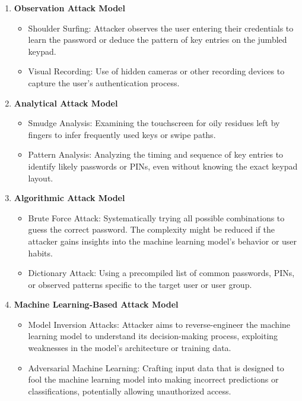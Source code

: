 \documentclass{article}
\begin{document}
\begin{enumerate}[label=\arabic*.]
    \item \textbf{Observation Attack Model}
    \begin{itemize}
        \item Shoulder Surfing: Attacker observes the user entering their credentials to learn the password or deduce the pattern of key entries on the jumbled keypad.
        \item Visual Recording: Use of hidden cameras or other recording devices to capture the user's authentication process.
    \end{itemize}
    
    \item \textbf{Analytical Attack Model}
    \begin{itemize}
        \item Smudge Analysis: Examining the touchscreen for oily residues left by fingers to infer frequently used keys or swipe paths.
        \item Pattern Analysis: Analyzing the timing and sequence of key entries to identify likely passwords or PINs, even without knowing the exact keypad layout.
    \end{itemize}
    
    \item \textbf{Algorithmic Attack Model}
    \begin{itemize}
        \item Brute Force Attack: Systematically trying all possible combinations to guess the correct password. The complexity might be reduced if the attacker gains insights into the machine learning model's behavior or user habits.
        \item Dictionary Attack: Using a precompiled list of common passwords, PINs, or observed patterns specific to the target user or user group.
    \end{itemize}
    
    \item \textbf{Machine Learning-Based Attack Model}
    \begin{itemize}
        \item Model Inversion Attacks: Attacker aims to reverse-engineer the machine learning model to understand its decision-making process, exploiting weaknesses in the model's architecture or training data.
        \item Adversarial Machine Learning: Crafting input data that is designed to fool the machine learning model into making incorrect predictions or classifications, potentially allowing unauthorized access.
    \end{itemize}
    

\end{enumerate}
\end{document}
